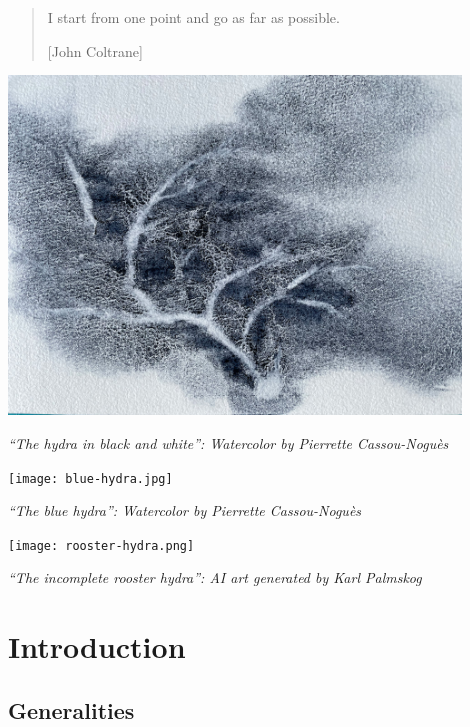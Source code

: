 \documentclass[twoside,a4paper]{book}
\begin{document}
\vspace{17mm}
\begin{quote} 
I start from one point and go as far as possible. 

[John Coltrane]
\end{quote}
\vspace{6pt}
\mbox{}
\label{watercolorgray}
 {\centering
      \includegraphics[width=12cm]{hydre-pierrette.jpg}
      \centerline{\emph{``The hydra in black and white'': Watercolor  by Pierrette Cassou-Noguès}}
}
\newpage
\newpage
\thispagestyle{empty}
\label{watercolor}
 {\centering
      \texttt{[image: blue-hydra.jpg]}
      \centerline{\emph{``The blue hydra'': Watercolor  by Pierrette Cassou-Noguès}}
}

\newpage
\thispagestyle{empty}
\label{roosterhydra}
 {\centering
      \texttt{[image: rooster-hydra.png]}\\
      \centerline{\emph{``The incomplete rooster hydra'': AI art generated by Karl Palmskog}}
}

  





 \tableofcontents



\chapter{Introduction}

  

\vspace{16pt}

\section{Generalities}
\end{document}
